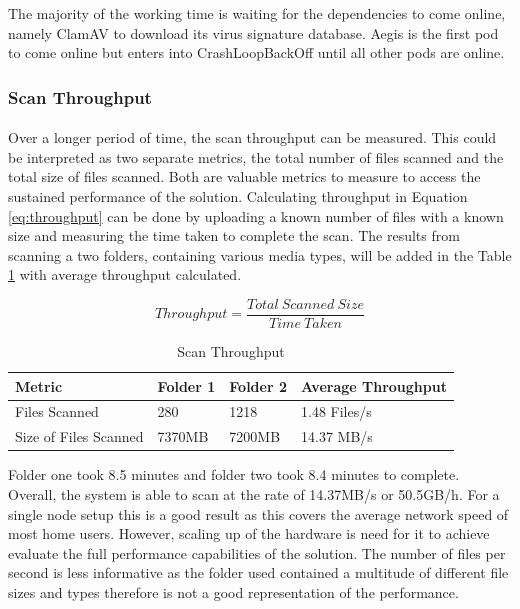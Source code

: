 \documentclass[12pt, conference, final, a4paper, onecolumn, compsoc]{IEEEtran}
\begin{document}
The majority of the working time is waiting for the dependencies to come online,
namely ClamAV to download its virus signature database. Aegis is the first pod
to come online but enters into CrashLoopBackOff until all other pods are online.

\subsubsection*{Scan Throughput}
\paragraph{}
Over a longer period of time, the scan throughput can be measured. This could be
interpreted as two separate metrics, the total number of files scanned and the
total size of files scanned. Both are valuable metrics to measure to access the
sustained performance of the solution. Calculating throughput in Equation
\ref{eq:throughput} can be done by uploading a known number of files with a
known size and measuring the time taken to complete the scan. The results from
scanning a two folders, containing various media types, will be added in the Table
\ref{tab:scan_throughput} with average throughput calculated.

\begin{equation}
  \label{eq:throughput}
  Throughput = \frac{Total\ Scanned\ Size}{Time\ Taken}
\end{equation}

\begin{table}[H] \centering
  \begin{tabular}{|l|l|l|l|}
    \hline
    \textbf{Metric}       & \textbf{Folder 1} & \textbf{Folder 2} & \textbf{Average Throughput}\\ \hline
    Files Scanned         & 280          &   1218         & 1.48 Files/s        \\\hline
    Size of Files Scanned & 7370MB       &   7200MB       & 14.37 MB/s \\
    \hline
  \end{tabular}
  \caption{Scan Throughput}
  \label{tab:scan_throughput}
\end{table}

Folder one took 8.5 minutes and folder two took 8.4 minutes to complete.
Overall, the system is able to scan at the rate of 14.37MB/s or 50.5GB/h. For a
single node setup this is a good result as this covers the average network speed
of most home users. However, scaling up of the hardware is need for it to
achieve evaluate the full performance capabilities of the solution. The number of
files per second is less informative as the folder used contained a multitude of
different file sizes and types therefore is not a good representation of the
performance.
\end{document}
